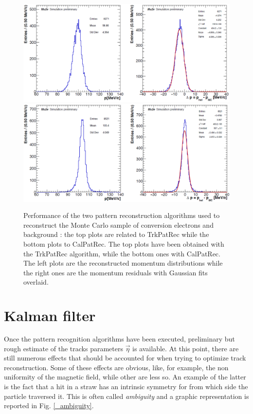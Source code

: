 \documentclass[12pt,a4paper,openright, oneside, titlepage]{book} %
\begin{document}
\begin{figure}[h!]
\centering
\includegraphics[scale=0.6]{giani_TrkPatRec_performance}
\includegraphics[scale=0.6]{giani_CalPatRec_performance}
\caption[Confront of two pattern recognition algorithms]{Performance of the two pattern reconstruction algorithms used to reconstruct 
the Monte Carlo sample of conversion electrons and background \cite{GianiPatRec:2020}: 
the top plots are related to TrkPatRec while the bottom plots to CalPatRec. 
The top plots have been obtained with the TrkPatRec algorithm,
while the bottom ones with CalPatRec. 
The left plots are the reconstructed momentum distributions 
while the right ones are the momentum residuals
with Gaussian fits overlaid.}
\label{_PatRec_performance}
\end{figure}

\section{Kalman filter}
Once the pattern recognition algorithms have been executed, 
preliminary but rough estimate of the tracks parameters $\vec{\eta}$ is available. 
At this point, there are still numerous effects that should be accounted for 
when trying to optimize track reconstruction. 
Some of these effects are obvious, 
like, for example, the non uniformity of the magnetic field, 
while other are less so. 
An example of the latter is the fact that a hit in a straw has 
an intrinsic symmetry for from which side the particle traversed it. 
This is often called \textit{ambiguity} and a graphic representation is reported in Fig. \ref{_ambiguity}.\\
\end{document}
